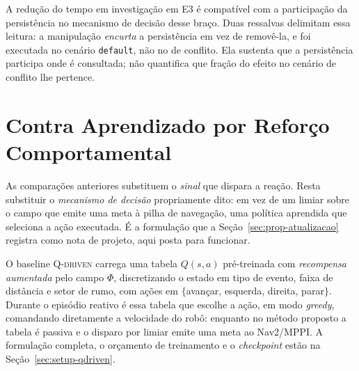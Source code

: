 A redução do tempo em investigação em E3 é compatível com a participação da
persistência no mecanismo de decisão desse braço. Duas ressalvas delimitam essa
leitura: a manipulação \emph{encurta} a persistência em vez de removê-la, e foi
executada no cenário \texttt{default}, não no de conflito. Ela sustenta que a
persistência participa onde é consultada; não quantifica que fração do efeito no
cenário de conflito lhe pertence.

\section{Contra Aprendizado por Reforço Comportamental}
\label{sec:res-qdriven}

As comparações anteriores substituem o \emph{sinal} que dispara a reação. Resta
substituir o \emph{mecanismo de decisão} propriamente dito: em vez de um limiar sobre
o campo que emite uma meta à pilha de navegação, uma política aprendida que seleciona
a ação executada. É a formulação que a Seção~\ref{sec:prop-atualizacao} registra como
nota de projeto, aqui posta para funcionar.

O baseline \textsc{Q-driven} carrega uma tabela $Q(s,a)$ pré-treinada com
\emph{recompensa aumentada} pelo campo $\Phi$, discretizando o estado em tipo de
evento, faixa de distância e setor de rumo, com ações em
$\{$avançar, esquerda, direita, parar$\}$. Durante o episódio reativo é essa tabela
que escolhe a ação, em modo \textit{greedy}, comandando diretamente a velocidade do
robô: enquanto no método proposto a tabela é passiva e o disparo por limiar emite
uma meta ao Nav2/MPPI. A formulação completa, o orçamento de treinamento e o
\textit{checkpoint} estão na Seção~\ref{sec:setup-qdriven}.

